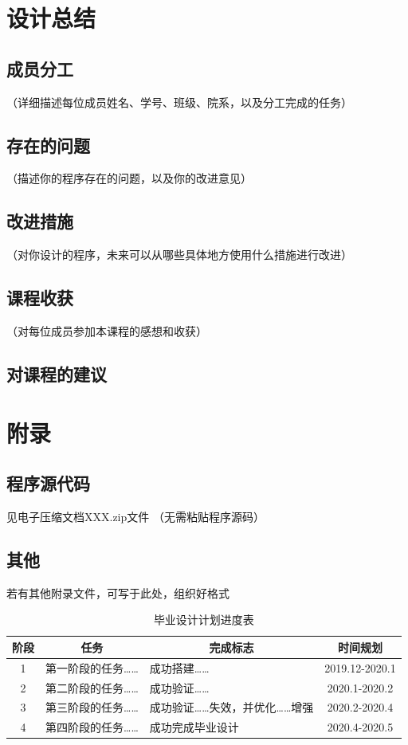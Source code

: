 \documentclass[UTF8,AutoFakeBold,AutoFakeSlant,zihao=-4]{ctexart}
\begin{document}
\section{设计总结}

\subsection{成员分工}
（详细描述每位成员姓名、学号、班级、院系，以及分工完成的任务）

\subsection{存在的问题}
（描述你的程序存在的问题，以及你的改进意见）

\subsection{改进措施}
（对你设计的程序，未来可以从哪些具体地方使用什么措施进行改进）

\subsection{课程收获}
（对每位成员参加本课程的感想和收获）

\subsection{对课程的建议}

\section{附录}
\subsection{程序源代码}
见电子压缩文档XXX.zip文件
（无需粘贴程序源码）

\subsection{其他}
若有其他附录文件，可写于此处，组织好格式



\begin{table}[!ht]
  \centering
  \caption{毕业设计计划进度表}
  \label{tab:progress}
  \begin{tabular}{@{}cllc@{}}
    \toprule
    阶段 & \multicolumn{1}{c}{任务} & \multicolumn{1}{c}{完成标志} & 时间规划       \\ \midrule
    1    & 第一阶段的任务……          & 成功搭建……                    & 2019.12-2020.1 \\ \midrule
    2    & 第二阶段的任务……          & 成功验证……                    & 2020.1-2020.2  \\ \midrule
    3    & 第三阶段的任务……          & 成功验证……失效，并优化……增强  & 2020.2-2020.4  \\ \midrule
    4    & 第四阶段的任务……          & 成功完成毕业设计              & 2020.4-2020.5  \\ \bottomrule
  \end{tabular}
\end{table}
\end{document}
